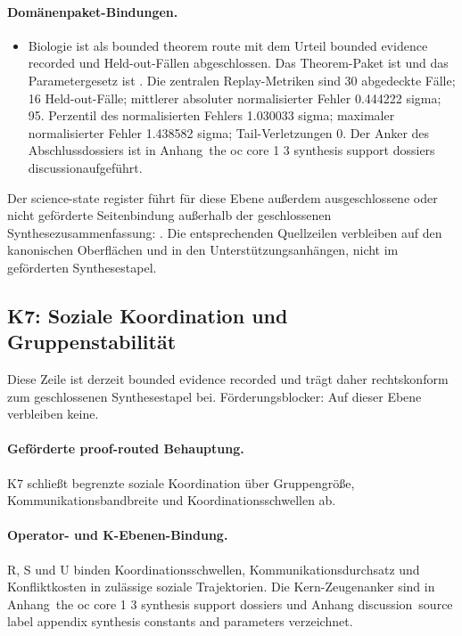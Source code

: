 \paragraph{Domänenpaket-Bindungen.}
\begin{itemize}[leftmargin=1.6em,nosep]
\item Biologie ist als bounded theorem route mit dem Urteil bounded evidence recorded und  Held-out-Fällen abgeschlossen. Das Theorem-Paket ist  und das Parametergesetz ist . Die zentralen Replay-Metriken sind 30 abgedeckte Fälle; 16 Held-out-Fälle; mittlerer absoluter normalisierter Fehler 0.444222 sigma; 95. Perzentil des normalisierten Fehlers 1.030033 sigma; maximaler normalisierter Fehler 1.438582 sigma; Tail-Verletzungen 0. Der Anker des Abschlussdossiers ist in Anhang~the oc core 1 3 synthesis support dossiers discussionaufgeführt.
\end{itemize}
Der science-state register führt für diese Ebene außerdem  ausgeschlossene oder nicht geförderte Seitenbindung außerhalb der geschlossenen Synthesezusammenfassung: . Die entsprechenden Quellzeilen verbleiben auf den kanonischen Oberflächen und in den Unterstützungsanhängen, nicht im geförderten Synthesestapel.

\subsection{K7: Soziale Koordination und Gruppenstabilität}
\label{sec:oc-core-1-3-synthesis-k7}
Diese Zeile ist derzeit bounded evidence recorded und trägt daher rechtskonform zum geschlossenen Synthesestapel bei.
Förderungsblocker: Auf dieser Ebene verbleiben keine.

\paragraph{Geförderte proof-routed Behauptung.}
K7 schließt begrenzte soziale Koordination über Gruppengröße, Kommunikationsbandbreite und Koordinationsschwellen ab.

\paragraph{Operator- und K-Ebenen-Bindung.}
R, S und U binden Koordinationsschwellen, Kommunikationsdurchsatz und Konfliktkosten in zulässige soziale Trajektorien.
Die Kern-Zeugenanker sind in Anhang~the oc core 1 3 synthesis support dossiers und Anhang discussion~source label appendix synthesis constants and parameters verzeichnet.

